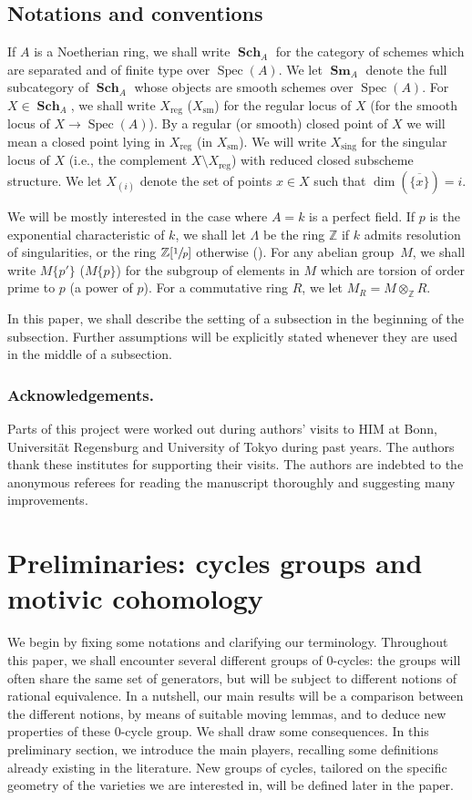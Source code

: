 \documentclass[JEP,XML,SOM,Unicode,published]{cedram}
\newcommand{\sm}{\mathrm{sm}}
\theoremstyle{definition}
\newcommand{\Z}{{\mathbb Z}}
\DeclareMathOperator{\Sch}{\mathbf{Sch}}
\DeclareMathOperator{\Sm}{\mathbf{Sm}}
\DeclareMathOperator{\Spec}{Spec}
\newcommand{\reg}{\mathrm{reg}}
\newcommand{\sing}{\mathrm{sing}}
\let\ov\overline
\begin{document}
\subsection*{Notations and conventions}
If $A$ is a Noetherian ring, we shall write $\Sch_A$ for the category
of schemes which are separated and of finite type over $\Spec(A)$.
We let $\Sm_A$ denote the full subcategory of $\Sch_A$ whose objects
are smooth schemes over $\Spec(A)$. For $X\in \Sch_A$, we shall write $X_{\reg}$ (\resp $X_{\sm}$) for the regular locus of $X$ (\resp for the smooth locus of $X\to \Spec(A)$). By a regular (or smooth) closed point of $X$ we will mean a closed point lying in $X_{\reg}$ (\resp in $X_{\sm}$). We will write $X_{\sing}$ for the singular locus of $X$ (i.e., the complement $X \setminus X_{\reg}$) with reduced closed subscheme structure. We let $X_{(i)}$ denote the set of points $x \in X$ such that
$\dim(\ov{\{x\}}) = i$.

We will be mostly interested in the case where $A = k$ is a perfect field.
If $p$ is the exponential characteristic of $k$,
we shall let $\Lambda$ be the ring $\Z$ if $k$ admits resolution of
singularities, or the ring $\Z[\sfrac{1}{p}]$ otherwise (\cite[Def.\,3.4]{FV}).
For any abelian group~$M$, we shall write $M\{p'\}$ (\resp $M\{p\}$) for the subgroup of elements in $M$ which are torsion of order prime to $p$ (\resp a power of $p$). For a commutative ring $R$, we let
$M_R = M \otimes_\Z R$.

In this paper, we shall describe the setting of a subsection in the beginning
of the subsection. Further assumptions will be explicitly stated whenever they are
used in the middle of a subsection.

\subsubsection*{Acknowledgements.}
Parts of this project were worked out during authors' visits to
HIM at Bonn, Universität Regensburg and University of Tokyo
during past years. The authors thank these institutes for supporting their
visits. The authors are indebted to the anonymous referees for reading the manuscript thoroughly and suggesting many improvements.

\section{Preliminaries: cycles groups and
motivic cohomology}\label{sec:set-up}
We begin by fixing some notations and clarifying our terminology.
Throughout this paper, we shall encounter several different groups of $0$-cycles: the groups will often share the same set of generators, but will be subject to different notions of rational equivalence. In a nutshell, our main results will be a comparison between the different notions, by means of suitable moving lemmas, and to deduce new
properties of these $0$-cycle group. We shall draw some consequences.
In this preliminary section, we introduce the main players, recalling some definitions already existing in the literature. New groups of cycles, tailored on the specific geometry of the varieties we are interested in, will be defined later in the paper.
\end{document}
